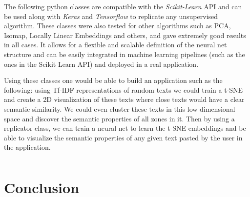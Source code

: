 \documentclass[a4paper,11pt,spanish]{report}
\begin{document}
The following python classes are compatible with the \textit{Scikit-Learn} API and can be used along with \textit{Keras} and \textit{Tensorflow} to replicate any unsupervised algorithm. These classes were also tested for other algorithms such as PCA, Isomap, Locally Linear Embeddings and others, and gave extremely good results in all cases. It allows for a flexible and scalable definition of the neural net structure and can be easily integrated in machine learning pipelines (such as the ones in the Scikit Learn API) and deployed in a real application.

Using these classes one would be able to build an application such as the following: using Tf-IDF representations of random texts we could train a t-SNE and create a 2D visualization of these texts where close texts would have a clear semantic similarity. We could even cluster these texts in this low dimensional space and discover the semantic properties of all zones in it. Then by using a replicator class, we can train a neural net to learn the t-SNE embeddings and be able to visualize the semantic properties of any given text pasted by the user in the application.

\vspace{10px}

\inputminted[baselinestretch=1, fontsize=\scriptsize, breaklines]{python}{classes.py}



\chapter{Conclusion}
\label{chap:conc}


\label{chap:bib}

\nocite{*}

% 


\end{document}
